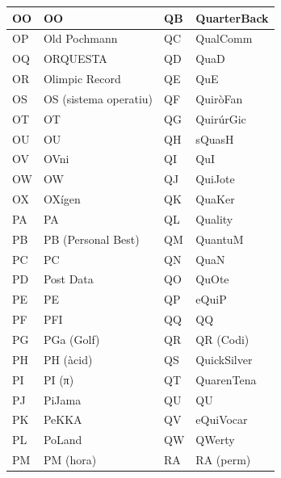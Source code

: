 \begin{table}[ht]
    \centering
    \begin{tabular}{|l|l|l|l|}
        \hline
        OO & OO                    & QB & QuarterBack      \\ \hline
        OP & Old Pochmann          & QC & QualComm         \\ \hline
        OQ & ORQUESTA              & QD & QuaD             \\ \hline
        OR & Olimpic Record        & QE & QuE              \\ \hline
        OS & OS (sistema operatiu) & QF & QuiròFan         \\ \hline
        OT & OT                    & QG & QuirúrGic        \\ \hline
        OU & OU                    & QH & sQuasH           \\ \hline
        OV & OVni                  & QI & QuI              \\ \hline
        OW & OW                    & QJ & QuiJote          \\ \hline
        OX & OXígen                & QK & QuaKer           \\ \hline
        PA & PA                    & QL & Quality          \\ \hline
        PB & PB (Personal Best)    & QM & QuantuM          \\ \hline
        PC & PC                    & QN & QuaN             \\ \hline
        PD & Post Data             & QO & QuOte            \\ \hline
        PE & PE                    & QP & eQuiP            \\ \hline
        PF & PFI                   & QQ & QQ               \\ \hline
        PG & PGa (Golf)            & QR & QR (Codi)        \\ \hline
        PH & PH (àcid)             & QS & QuickSilver      \\ \hline
        PI & PI (π)                & QT & QuarenTena       \\ \hline
        PJ & PiJama                & QU & QU               \\ \hline
        PK & PeKKA                 & QV & eQuiVocar        \\ \hline
        PL & PoLand                & QW & QWerty           \\ \hline
        PM & PM (hora)             & RA & RA (perm)        \\ \hline

\end{tabular}
\end{table}
